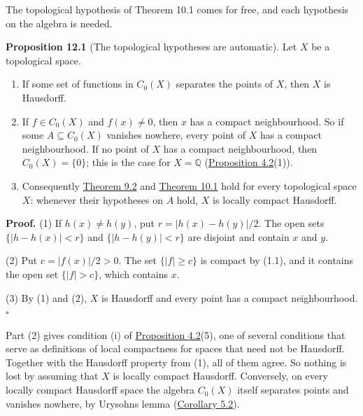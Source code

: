 \documentclass[
  english,
  11pt,
  a4paper,
]{article}
\providecommand{\tightlist}{%
  \setlength{\itemsep}{0pt}\setlength{\parskip}{0pt}}
\begin{document}
The topological hypothesis of Theorem 10.1 comes for free, and each
hypothesis on the algebra is needed.

\textbf{Proposition 12.1} (The topological hypotheses are automatic).
Let \(X\) be a topological space.

\begin{enumerate}
\tightlist
\item
  If some set of functions in \(C_0(X)\) separates the points of \(X\),
  then \(X\) is Hausdorff.
\item
  If \(f\in C_0(X)\) and \(f(x)\neq0\), then \(x\) has a compact
  neighbourhood. So if some \(A\subseteq C_0(X)\) vanishes nowhere,
  every point of \(X\) has a compact neighbourhood. If no point of \(X\)
  has a compact neighbourhood, then \(C_0(X)=\{0\}\); this is the case
  for \(X=\mathbb Q\)
  (\hyperlink{the-stone-weierstrass-theorem-for-functions-vanishing-at-infinity--oa-fnd-sw-15}{Proposition
  4.2}(1)).
\item
  Consequently
  \hyperlink{the-stone-weierstrass-theorem-for-functions-vanishing-at-infinity--oa-fnd-sw-08}{Theorem
  9.2} and
  \hyperlink{the-stone-weierstrass-theorem-for-functions-vanishing-at-infinity--oa-fnd-sw-09}{Theorem
  10.1} hold for every topological space \(X\): whenever their
  hypotheses on \(A\) hold, \(X\) is locally compact Hausdorff.
\end{enumerate}

\textbf{Proof.} (1) If \(h(x)\neq h(y)\), put \(r=|h(x)-h(y)|/2\). The
open sets \(\{|h-h(x)|<r\}\) and \(\{|h-h(y)|<r\}\) are disjoint and
contain \(x\) and \(y\).

(2) Put \(c=|f(x)|/2>0\). The set \(\{|f|\geq c\}\) is compact by (1.1),
and it contains the open set \(\{|f|>c\}\), which contains \(x\).

(3) By (1) and (2), \(X\) is Hausdorff and every point has a compact
neighbourhood. \(\square\)

Part (2) gives condition (i) of
\hyperlink{the-stone-weierstrass-theorem-for-functions-vanishing-at-infinity--oa-fnd-sw-15}{Proposition
4.2}(5), one of several conditions that serve as definitions of local
compactness for spaces that need not be Hausdorff. Together with the
Hausdorff property from (1), all of them agree. So nothing is lost by
assuming that \(X\) is locally compact Hausdorff. Conversely, on every
locally compact Hausdorff space the algebra \(C_0(X)\) itself separates
points and vanishes nowhere, by Urysohn\textquotesingle s lemma
(\hyperlink{the-stone-weierstrass-theorem-for-functions-vanishing-at-infinity--oa-fnd-sw-16}{Corollary
5.2}).
\end{document}
